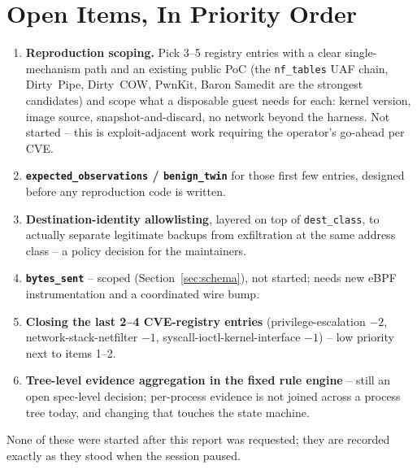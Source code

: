 \documentclass[11pt,a4paper]{article}
\begin{document}
\clearpage

\section{Open Items, In Priority Order}
\label{sec:open}

\begin{enumerate}
\item \textbf{Reproduction scoping.} Pick 3--5 registry entries with a
  clear single-mechanism path and an existing public PoC (the
  \texttt{nf\_tables} UAF chain, Dirty~Pipe, Dirty~COW, PwnKit, Baron
  Samedit are the strongest candidates) and scope what a disposable guest
  needs for each: kernel version, image source, snapshot-and-discard,
  no network beyond the harness. Not started -- this is exploit-adjacent
  work requiring the operator's go-ahead per CVE.
\item \textbf{\texttt{expected\_observations} / \texttt{benign\_twin}}
  for those first few entries, designed before any reproduction code is
  written.
\item \textbf{Destination-identity allowlisting}, layered on top of
  \texttt{dest\_class}, to actually separate legitimate backups from
  exfiltration at the same address class -- a policy decision for the
  maintainers.
\item \textbf{\texttt{bytes\_sent}} -- scoped (Section~\ref{sec:schema}),
  not started; needs new eBPF instrumentation and a coordinated wire
  bump.
\item \textbf{Closing the last 2--4 CVE-registry entries}
  (privilege-escalation $-2$, network-stack-netfilter $-1$,
  syscall-ioctl-kernel-interface $-1$) -- low priority next to items 1--2.
\item \textbf{Tree-level evidence aggregation in the fixed rule engine} --
  still an open spec-level decision; per-process evidence is not joined
  across a process tree today, and changing that touches the state
  machine.
\end{enumerate}

\vspace{1em}
\noindent None of these were started after this report was requested;
they are recorded exactly as they stood when the session paused.
\end{document}
